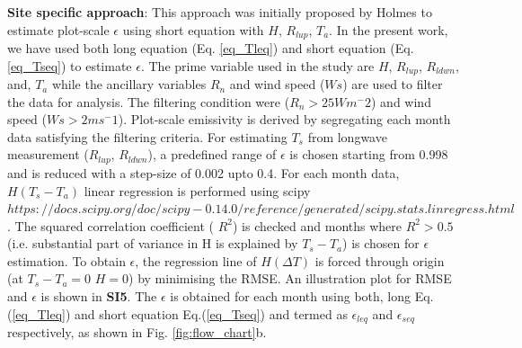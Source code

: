 \documentclass[fleqn,10pt]{wlscirep}
\begin{document}
\textbf{Site specific approach}:
This approach was initially proposed by Holmes\cite{holmes_land_2009-1} to estimate plot-scale $\epsilon$ using short equation with $H$, $R_{lup}$, $T_{a}$. In the present work, we have used both long equation (Eq. \ref{eq_Tleq}) and short equation (Eq. \ref{eq_Tseq}) to estimate $\epsilon$.
The prime variable used in the study are $H$, $R_{lup}$, $R_{ldwn}$, and, $T_{a}$ while the ancillary variables $R_{n}$ and wind speed ($Ws$) are used to filter the data for analysis. The filtering condition were ($R_{n} > 25 Wm^-2$) and wind speed ($Ws > 2ms^-1$)\cite{holmes_land_2009}. Plot-scale emissivity is derived by segregating each month data satisfying the filtering criteria. For estimating $T_{s}$ from longwave measurement ($R_{lup}$, $R_{ldwn}$), a predefined range of $\epsilon$ is chosen starting from 0.998 and is reduced with a step-size of 0.002 upto 0.4. For each month data, $H (T_{s} - T_{a})$ linear regression is performed using scipy $https://docs.scipy.org/doc/scipy-0.14.0/reference/generated/scipy.stats.linregress.html$. The squared correlation coefficient (
$R^2$) is checked and months where $R^{2} > 0.5$ (i.e. substantial part of variance in H is explained by $T_{s} -T_{a}$) is chosen for $\epsilon$ estimation. To obtain $\epsilon$, the regression line of $H (\Delta T)$ is forced through origin (at $T_{s} - T_{a} = 0 $  $H=0$) by minimising the RMSE. An illustration plot for RMSE and $\epsilon$ is shown in \textbf{SI5}. The $\epsilon$ is obtained for each month using both, long Eq.(\ref{eq_Tleq}) and short equation Eq.(\ref{eq_Tseq}) and termed as $\epsilon_{leq}$ and $\epsilon_{seq}$ respectively, as shown in Fig. \ref{fig:flow_chart}b.
 
\end{document}
